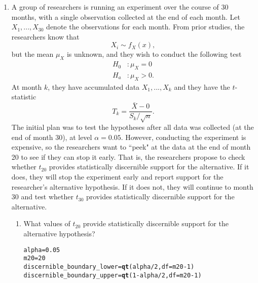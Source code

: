 \documentclass{article}\usepackage[]{graphicx}\usepackage[]{xcolor}
\makeatletter
\newcommand{\hlnum}[1]{\textcolor[rgb]{0.686,0.059,0.569}{#1}}%
\newcommand{\hlopt}[1]{\textcolor[rgb]{0,0,0}{#1}}%
\newcommand{\hldef}[1]{\textcolor[rgb]{0.345,0.345,0.345}{#1}}%
\newcommand{\hlkwb}[1]{\textcolor[rgb]{0.69,0.353,0.396}{#1}}%
\newcommand{\hlkwc}[1]{\textcolor[rgb]{0.333,0.667,0.333}{#1}}%
\newcommand{\hlkwd}[1]{\textcolor[rgb]{0.737,0.353,0.396}{\textbf{#1}}}%
\newenvironment{kframe}{%
 \def\at@end@of@kframe{}%
 \ifinner\ifhmode%
  \def\at@end@of@kframe{\end{minipage}}%
  \begin{minipage}{\columnwidth}%
 \fi\fi%
 \def\FrameCommand##1{\hskip\@totalleftmargin \hskip-\fboxsep
 \colorbox{shadecolor}{##1}\hskip-\fboxsep
     \hskip-\linewidth \hskip-\@totalleftmargin \hskip\columnwidth}%
 \MakeFramed {\advance\hsize-\width
   \@totalleftmargin\z@ \linewidth\hsize
   \@setminipage}}%
 {\par\unskip\endMakeFramed%
 \at@end@of@kframe}
\newenvironment{knitrout}{}{} %
\makeatother
\begin{document}
\begin{enumerate}
\item A group of researchers is running an experiment over the course of 30 months, 
with a single observation collected at the end of each month. Let $X_1, ..., X_{30}$
denote the observations for each month. From prior studies, the researchers know that
\[X_i \sim f_X(x),\]
but the mean $\mu_X$ is unknown, and they wish to conduct the following test
\begin{align*}
H_0&: \mu_X = 0\\
H_a&: \mu_X > 0.
\end{align*}
At month $k$, they have accumulated data $X_1, ..., X_k$ and they have the 
$t$-statistic
\[T_k = \frac{\bar{X} - 0}{S_k/\sqrt{n}}.\]
The initial plan was to test the hypotheses after all data was collected (at the 
end of month 30), at level $\alpha=0.05$. However, conducting the experiment is 
expensive, so the researchers want to ``peek" at the data at the end of month 20 
to see if they can stop it early. That is, the researchers propose to check 
whether $t_{20}$ provides statistically discernible support for the alternative. 
If it does, they will stop the experiment early and report support for the 
researcher's alternative hypothesis. If it does not, they will continue to month 
30 and test whether $t_{30}$ provides statistically discernible support for the
alternative.

\begin{enumerate}
  \item What values of $t_{20}$ provide statistically discernible support for the
  alternative hypothesis?
  
\begin{knitrout}
\color{fgcolor}\begin{kframe}
\begin{alltt}
\hldef{alpha} \hlkwb{=} \hlnum{0.05}
\hldef{m20} \hlkwb{=} \hlnum{20}
\hldef{discernible_boundary_lower} \hlkwb{=} \hlkwd{qt}\hldef{(alpha}\hlopt{/}\hlnum{2}\hldef{,} \hlkwc{df} \hldef{= m20}\hlopt{-}\hlnum{1}\hldef{)}
\hldef{discernible_boundary_upper} \hlkwb{=} \hlkwd{qt}\hldef{(}\hlnum{1}\hlopt{-}\hldef{alpha}\hlopt{/}\hlnum{2}\hldef{,} \hlkwc{df} \hldef{= m20}\hlopt{-}\hlnum{1}\hldef{)}


\end{alltt}
\end{kframe}
\end{knitrout}
\end{enumerate}
\end{enumerate}
\end{document}
